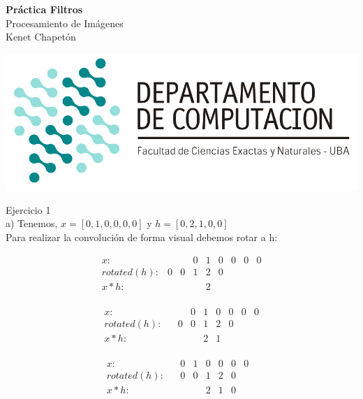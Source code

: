\documentclass[11pt]{article}
\begin{document}
\begin{minipage}{0.4\textwidth}
    \raggedleft 
    \textbf{\Large Pr\'actica Filtros} \\ %
    Procesamiento de Imágenes \\ %
    Kenet Chapet\'on \\ 
\end{minipage}
\begin{minipage}{0.5\textwidth}
    \flushright %
    \includegraphics[width=0.7\linewidth]{logo_dc.jpg} %
\end{minipage}
\vspace{2em} %

Ejercicio 1 \\ 

a) Tenemos, $ x = [0,1,0,0,0,0] $ y $h = [0,2,1,0,0]$ \\

Para realizar la convolución de forma visual debemos rotar a h: 

\[
\begin{array}{ccccccccccc}
x: & & & 0 & 1 & 0 & 0 & 0 & 0  \\
rotated(h):  & 0 & 0 & 1 & 2 & 0 & & \\
x * h:  & & & & 2 &  &  &  &   \\
\end{array}
\]

\[
\begin{array}{ccccccccccc}
x: & & & 0 & 1 & 0 & 0 & 0 & 0  \\
rotated(h):  & & 0 & 0 & 1 & 2 & 0   \\
x*h: & & & & 2 & 1 &  &  &   \\
\end{array}
\]

\[
\begin{array}{ccccccccccc}
x:  & & 0 & 1 & 0 & 0 & 0 & 0  \\
rotated(h):   &  & 0 & 0 & 1 & 2 & 0 \\
x*h:  & & & & 2 & 1 & 0 &  &   \\
\end{array}
\]
\end{document}
